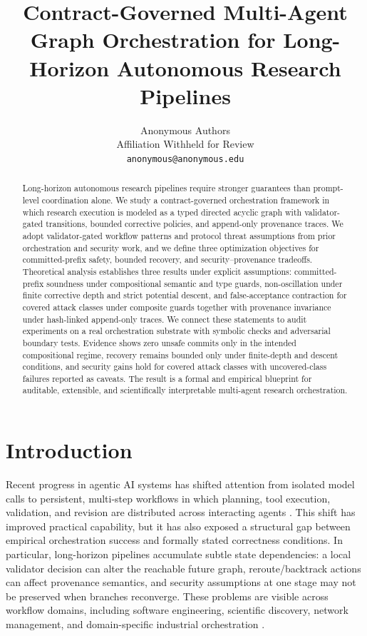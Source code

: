 \documentclass{article} %
\title{Contract-Governed Multi-Agent Graph Orchestration for Long-Horizon Autonomous Research Pipelines}
\author{Anonymous Authors \\
Affiliation Withheld for Review \\
\texttt{anonymous@anonymous.edu}}
\begin{document}
\maketitle

\begin{abstract}
Long-horizon autonomous research pipelines require stronger guarantees than prompt-level coordination alone. We study a contract-governed orchestration framework in which research execution is modeled as a typed directed acyclic graph with validator-gated transitions, bounded corrective policies, and append-only provenance traces. We adopt validator-gated workflow patterns and protocol threat assumptions from prior orchestration and security work, and we define three optimization objectives for committed-prefix safety, bounded recovery, and security--provenance tradeoffs. Theoretical analysis establishes three results under explicit assumptions: committed-prefix soundness under compositional semantic and type guards, non-oscillation under finite corrective depth and strict potential descent, and false-acceptance contraction for covered attack classes under composite guards together with provenance invariance under hash-linked append-only traces. We connect these statements to audit experiments on a real orchestration substrate with symbolic checks and adversarial boundary tests. Evidence shows zero unsafe commits only in the intended compositional regime, recovery remains bounded only under finite-depth and descent conditions, and security gains hold for covered attack classes with uncovered-class failures reported as caveats. The result is a formal and empirical blueprint for auditable, extensible, and scientifically interpretable multi-agent research orchestration.
\end{abstract}

\section{Introduction}
\label{sec:introduction}
Recent progress in agentic AI systems has shifted attention from isolated model calls to persistent, multi-step workflows in which planning, tool execution, validation, and revision are distributed across interacting agents \citep{song2026,chang2025,sawant2026,ferrag2025,wei2025}. This shift has improved practical capability, but it has also exposed a structural gap between empirical orchestration success and formally stated correctness conditions. In particular, long-horizon pipelines accumulate subtle state dependencies: a local validator decision can alter the reachable future graph, reroute/backtrack actions can affect provenance semantics, and security assumptions at one stage may not be preserved when branches reconverge. These problems are visible across workflow domains, including software engineering, scientific discovery, network management, and domain-specific industrial orchestration \citep{jin2025,yamada2025,pham2026,wang2025b,wang2025,sun2025,sun2025b,stewart2025}.
\end{document}
